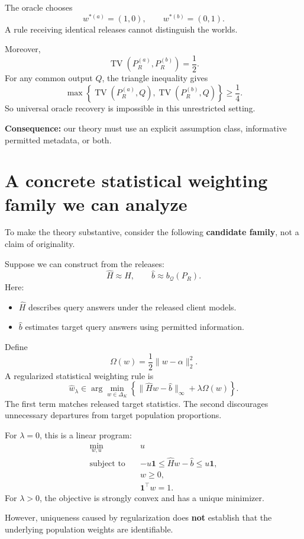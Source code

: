 \documentclass[11pt,a4paper]{article}
\begin{document}
The oracle chooses
\[
w^{*(a)}=(1,0),\qquad w^{*(b)}=(0,1).
\]
A rule receiving identical releases cannot distinguish the worlds.

Moreover,
\[
\operatorname{TV}\left(P_R^{(a)},P_R^{(b)}\right)=\frac12.
\]
For any common output $Q$, the triangle inequality gives
\[
\max\left\{\operatorname{TV}(P_R^{(a)},Q),
\operatorname{TV}(P_R^{(b)},Q)\right\}\geq\frac14.
\]
So universal oracle recovery is impossible in this unrestricted setting.

\textbf{Consequence:} our theory must use an explicit assumption class, informative permitted metadata, or both.

\section{A concrete statistical weighting family we can analyze}
To make the theory substantive, consider the following \textbf{candidate family}, not a claim of originality.

Suppose we can construct from the releases:
\[
\widehat H\approx H,\qquad\widehat b\approx b_{\mathcal Q}(P_R).
\]
Here:
\begin{itemize}
\item $\widehat H$ describes query answers under the released client models.
\item $\widehat b$ estimates target query answers using permitted information.
\end{itemize}
Define
\[
\Omega(w)=\frac12\|w-\alpha\|_2^2.
\]
A regularized statistical weighting rule is
\[
\boxed{\widehat w_\lambda\in\arg\min_{w\in\Delta_K}
\left\{\|\widehat H w-\widehat b\|_\infty+\lambda\Omega(w)\right\}.}
\]
The first term matches released target statistics. The second discourages unnecessary departures from target population proportions.

For $\lambda=0$, this is a linear program:
\[
\begin{aligned}
\min_{w,u}\quad &u\\
\text{subject to}\quad &-u\mathbf1\leq\widehat H w-\widehat b\leq u\mathbf1,\\
&w\geq0,\\
&\mathbf1^\top w=1.
\end{aligned}
\]
For $\lambda>0$, the objective is strongly convex and has a unique minimizer.

However, uniqueness caused by regularization does \textbf{not} establish that the underlying population weights are identifiable.
\end{document}
